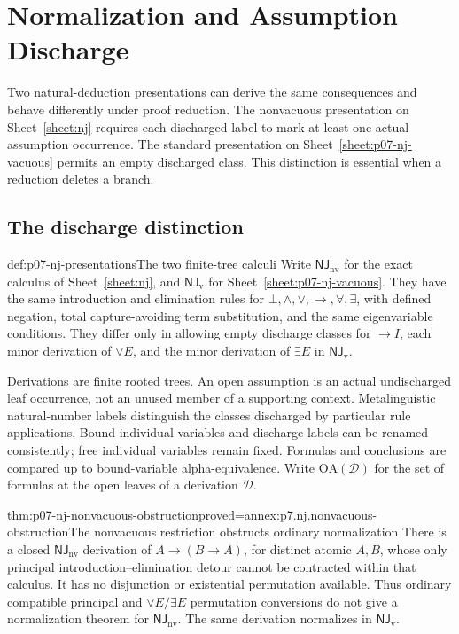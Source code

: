 \chapter{Normalization and Assumption Discharge}
\label{sec:p07-natural-deduction-normalization}

Two natural-deduction presentations can derive the same consequences
and behave differently under proof reduction. The nonvacuous presentation
on Sheet~\ref{sheet:nj} requires each discharged label to mark at least
one actual assumption occurrence. The standard presentation on
Sheet~\ref{sheet:p07-nj-vacuous} permits an empty discharged class.
This distinction is essential when a reduction deletes a branch.

\section{The discharge distinction}

\begin{hbdefinition}{def:p07-nj-presentations}{The two finite-tree calculi}
Write \(\mathsf{NJ}_{\mathrm{nv}}\) for the exact calculus of
Sheet~\ref{sheet:nj}, and \(\mathsf{NJ}_{\mathrm v}\) for
Sheet~\ref{sheet:p07-nj-vacuous}. They have the same introduction
and elimination rules for
\(\bot,\land,\lor,\to,\forall,\exists\), with defined negation,
total capture-avoiding term substitution, and the same eigenvariable
conditions. They differ only in allowing empty discharge classes for
\(\to I\), each minor derivation of \(\lor E\), and the minor
derivation of \(\exists E\) in \(\mathsf{NJ}_{\mathrm v}\).

Derivations are finite rooted trees. An open assumption is an actual
undischarged leaf occurrence, not an unused member of a supporting
context. Metalinguistic natural-number labels distinguish the classes discharged by particular rule
applications. Bound individual variables and discharge labels can be
renamed consistently; free individual variables remain fixed.
Formulas and conclusions are compared up to bound-variable
alpha-equivalence. Write \(\mathrm{OA}(\mathcal D)\) for the set
of formulas at the open leaves of a derivation \(\mathcal D\).
\end{hbdefinition}

\begin{hbtheorem}{thm:p07-nj-nonvacuous-obstruction}{proved=annex:p7.nj.nonvacuous-obstruction}{The nonvacuous restriction obstructs ordinary normalization}
There is a closed \(\mathsf{NJ}_{\mathrm{nv}}\) derivation of
\(A\to(B\to A)\), for distinct atomic \(A,B\), whose only
principal introduction--elimination detour cannot be contracted
within that calculus. It has no disjunction or existential
permutation available. Thus ordinary compatible principal and
\(\lor E/\exists E\) permutation conversions do not give a
normalization theorem for \(\mathsf{NJ}_{\mathrm{nv}}\).
The same derivation normalizes in \(\mathsf{NJ}_{\mathrm v}\).
\end{hbtheorem}

